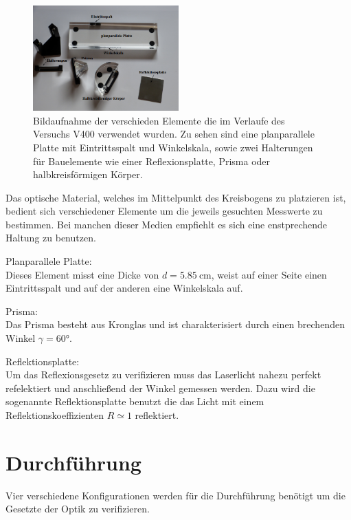 \begin{figure}
    \centering
    \includegraphics[width=0.5\textwidth]{bilder/teile.png}
    \caption{Bildaufnahme der verschieden Elemente die im Verlaufe des Versuchs V400 verwendet wurden. Zu sehen sind eine planparallele Platte mit Eintrittsspalt und Winkelskala, sowie zwei Halterungen für Bauelemente wie einer Reflexionsplatte, Prisma oder halbkreisförmigen Körper. \cite{skript}} 
    \label{fig:teile}
\end{figure}
\FloatBarrier

Das optische Material, welches im Mittelpunkt des Kreisbogens zu platzieren ist, bedient sich verschiedener Elemente um 
die jeweils gesuchten Messwerte zu bestimmen. Bei manchen dieser Medien empfiehlt es sich eine enstprechende Haltung zu benutzen.
\begin{description}
    \label{idkwhatthisissss}
    \item Planparallele Platte: \\
    Dieses Element misst eine Dicke von $d = \SI{5.85}{\cm}$, weist auf einer Seite einen Eintrittsspalt und auf der anderen 
    eine Winkelskala auf.
    \item Prisma: \\
    Das Prisma besteht aus Kronglas und ist charakterisiert durch einen brechenden Winkel $\gamma = 60 \si{\degree}$.
    \item Reflektionsplatte: \label{lol}\\ 
    Um das Reflexionsgesetz zu verifizieren muss das Laserlicht nahezu perfekt refelektiert und anschließend der Winkel
    gemessen werden. Dazu wird die sogenannte Reflektionsplatte benutzt die das Licht mit einem Reflektionskoeffizienten $R ≃ 1$
    reflektiert.
\end{description}
\newpage
\section{Durchführung}
Vier verschiedene Konfigurationen werden für die Durchführung benötigt um die Gesetzte der Optik zu verifizieren.

